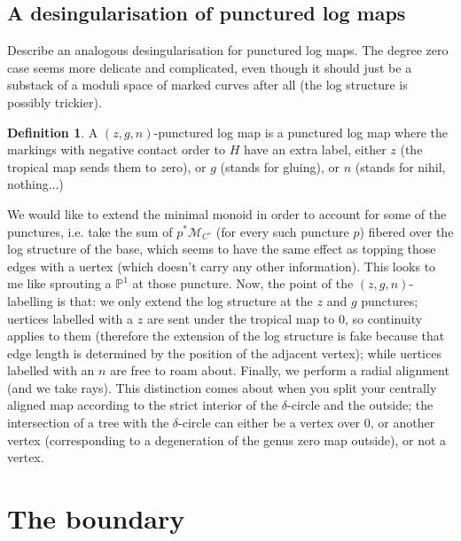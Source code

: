 \documentclass[11pt]{amsart}
\newcommand{\PP}{\mathbb P}
\theoremstyle{definition}
\theoremstyle{definition}
\newtheorem{dfn}[thm]{Definition}
\begin{document}
\subsection{A desingularisation of punctured log maps}
Describe an analogous desingularisation for punctured log maps. The degree zero case seems more delicate and complicated, even though it should just be a substack of a moduli space of marked curves after all (the log structure is possibly trickier).
\begin{dfn}
 A $(z,g,n)$-punctured log map is a punctured log map where the markings with negative contact order to $H$ have an extra label, either $z$ (the tropical map sends them to $z$ero), or $g$ (stands for gluing), or $n$ (stands for nihil, nothing...)
\end{dfn}
We would like to extend the minimal monoid in order to account for some of the punctures, i.e. take the sum of $p^*\mathcal M_{C^\circ}$ (for every such puncture $p$) fibered over the log structure of the base, which seems to have the same effect as topping those edges with a uertex (which doesn't carry any other information). This looks to me like sprouting a $\PP^1$ at those puncture. Now, the point of the $(z,g,n)$-labelling is that: we only extend the log structure at the $z$ and $g$ punctures; uertices labelled with a $z$ are sent under the tropical map to $0$, so continuity applies to them (therefore the extension of the log structure is fake because that edge length is determined by the position of the adjacent vertex); while uertices labelled with an $n$ are free to roam about. Finally, we perform a radial alignment (and we take rays). This distinction comes about when you split your centrally aligned map according to the strict interior of the $\delta$-circle and the outside; the intersection of a tree with the $\delta$-circle can either be a vertex over $0$, or another vertex (corresponding to a degeneration of the genus zero map outside), or not a vertex.



\section{The boundary}
\end{document}
